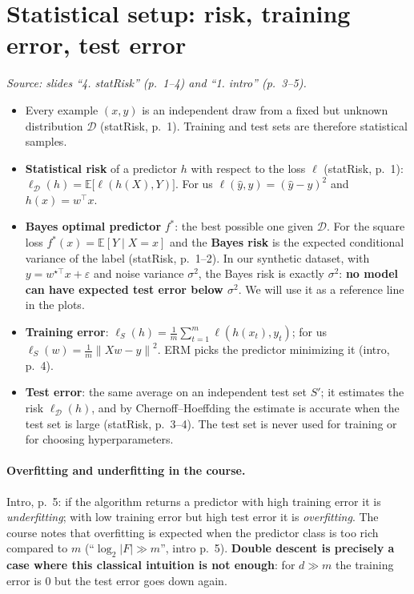 \documentclass[11pt,a4paper]{article}
\newcommand{\E}{\mathbb{E}}
\newcommand{\norm}[1]{\left\lVert #1 \right\rVert}
\newcommand{\fonte}[1]{\par\noindent\textit{Source: #1}\par\smallskip}
\begin{document}
\section{Statistical setup: risk, training error, test error}
\fonte{slides ``4. statRisk'' (p.~1--4) and ``1. intro'' (p.~3--5).}

\begin{itemize}
  \item Every example $(x,y)$ is an independent draw from a fixed but unknown distribution $\mathcal{D}$ (statRisk, p.~1).
        Training and test sets are therefore statistical samples.
  \item \textbf{Statistical risk} of a predictor $h$ with respect to the loss $\ell$ (statRisk, p.~1):
        $\ell_{\mathcal{D}}(h) = \E\bigl[\ell(h(X), Y)\bigr]$. For us $\ell(\hat y, y) = (\hat y - y)^2$ and $h(x) = w^\top x$.
  \item \textbf{Bayes optimal predictor} $f^\ast$: the best possible one given $\mathcal{D}$. For the square loss
        $f^\ast(x) = \E[Y \mid X = x]$ and the \textbf{Bayes risk} is the expected conditional variance of the label
        (statRisk, p.~1--2). In our synthetic dataset, with $y = w^{\star\top}x + \varepsilon$ and noise variance $\sigma^2$,
        the Bayes risk is exactly $\sigma^2$: \textbf{no model can have expected test error below $\sigma^2$}.
        We will use it as a reference line in the plots.
  \item \textbf{Training error}: $\ell_S(h) = \frac{1}{m}\sum_{t=1}^{m} \ell(h(x_t), y_t)$; for us
        $\ell_S(w) = \frac{1}{m}\norm{Xw - y}^2$. ERM picks the predictor minimizing it (intro, p.~4).
  \item \textbf{Test error}: the same average on an independent test set $S'$; it estimates the risk $\ell_{\mathcal{D}}(h)$,
        and by Chernoff--Hoeffding the estimate is accurate when the test set is large (statRisk, p.~3--4).
        The test set is never used for training or for choosing hyperparameters.
\end{itemize}

\paragraph{Overfitting and underfitting in the course.}
Intro, p.~5: if the algorithm returns a predictor with high training error it is \emph{underfitting}; with low training error
but high test error it is \emph{overfitting}. The course notes that overfitting is expected when the predictor class is too
rich compared to $m$ (``$\log_2|F| \gg m$'', intro p.~5). \textbf{Double descent is precisely a case where this classical
intuition is not enough}: for $d \gg m$ the training error is $0$ but the test error goes down again.
\end{document}
